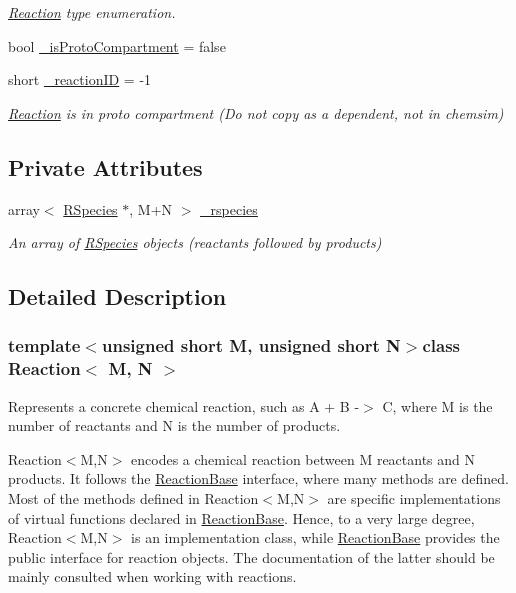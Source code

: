 \begin{DoxyCompactItemize}
\begin{DoxyCompactList}\small\item\em \hyperlink{classReaction}{Reaction} type enumeration. \end{DoxyCompactList}\item 
bool \hyperlink{classReactionBase_adf06f0937df570e381fb8db4312d81c6}{\+\_\+is\+Proto\+Compartment} = false
\item 
short \hyperlink{classReactionBase_a36d0a7b500e3df2944eb3ff61fa84617}{\+\_\+reaction\+I\+D} = -\/1
\begin{DoxyCompactList}\small\item\em \hyperlink{classReaction}{Reaction} is in proto compartment (Do not copy as a dependent, not in chemsim) \end{DoxyCompactList}\end{DoxyCompactItemize}
\subsection*{Private Attributes}
\begin{DoxyCompactItemize}
\item 
array$<$ \hyperlink{classRSpecies}{R\+Species} $\ast$, M+N $>$ \hyperlink{classReaction_a7d4b32fa500aefd7aef6910eef61290f}{\+\_\+rspecies}
\begin{DoxyCompactList}\small\item\em An array of \hyperlink{classRSpecies}{R\+Species} objects (reactants followed by products) \end{DoxyCompactList}\end{DoxyCompactItemize}


\subsection{Detailed Description}
\subsubsection*{template$<$unsigned short M, unsigned short N$>$class Reaction$<$ M, N $>$}

Represents a concrete chemical reaction, such as A + B -\/$>$ C, where M is the number of reactants and N is the number of products. 

Reaction$<$\+M,\+N$>$ encodes a chemical reaction between M reactants and N products. It follows the \hyperlink{classReactionBase}{Reaction\+Base} interface, where many methods are defined. Most of the methods defined in Reaction$<$\+M,\+N$>$ are specific implementations of virtual functions declared in \hyperlink{classReactionBase}{Reaction\+Base}. Hence, to a very large degree, Reaction$<$\+M,\+N$>$ is an implementation class, while \hyperlink{classReactionBase}{Reaction\+Base} provides the public interface for reaction objects. The documentation of the latter should be mainly consulted when working with reactions. 


